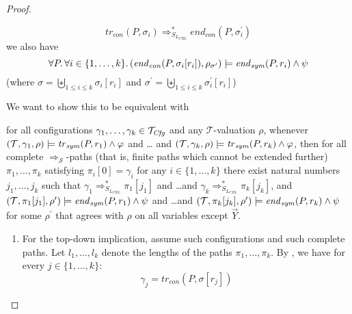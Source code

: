 \begin{proof}
\begin{proofenv}
\begin{equation*}
            \mathit{tr}_{\mathit{con}}(P, \sigma_i) \Rightarrow^*_{S_{L_{\mathit{CHL}}}} \mathit{end}_{\mathit{con}}(P, \sigma^\prime_i)
        \end{equation*}
        we also have
        \begin{equation*}
            \forall P.\, \forall i \in \{ 1, \ldots, k \} . \,
            (\mathit{end}_{\mathit{con}}(P, \sigma_i[r_i]), \rho_{\sigma^\prime})
            \models \mathit{end}_{\mathit{sym}}(P, r_i) \land \psi
        \end{equation*}
        (where $\sigma = \biguplus_{1 \leq i \leq k} \sigma_i[r_i]$
        and $\sigma^\prime = \biguplus_{1 \leq i \leq k} \sigma^\prime_i[r_i]$)
    \end{proofenv}

    We want to show this to be equivalent with
    \begin{proofenv}
        for all configurations $\gamma_1,\ldots,\gamma_k \in \mathcal{T}_{\mathit{Cfg}}$
        and any $\mathcal{T}$-valuation $\rho$,
        whenever $(\mathcal{T}, \gamma_1,\rho) \models \mathit{tr}_{\mathit{sym}}(P, r_1) \land \varphi$ and \ldots
        and $(\mathcal{T}, \gamma_k,\rho) \models \mathit{tr}_{\mathit{sym}}(P, r_k) \land \varphi$,
        then for all complete $\Rightarrow_{\mathcal{S}}$-paths (that is, finite paths which cannot be extended further)
        $\pi_1,\ldots,\pi_k$
        satisfying $\pi_i[0] = \gamma_i$ for any $i \in \{ 1, \ldots, k \}$
        there exist natural numbers $j_1, \ldots, j_k$
        such that $\gamma_1 \Rightarrow^{*}_{S_{L_{\mathit{CHL}}}} \pi_1[j_1]$
        and \ldots and $\gamma_k \Rightarrow^{*}_{S_{L_{\mathit{CHL}}}} \pi_k[j_k]$,
        and $(\mathcal{T}, \pi_1[j_1], \rho^\prime) \models \mathit{end}_{\mathit{sym}}(P, r_1) \land \psi$
        and \ldots and $(\mathcal{T}, \pi_k[j_k], \rho^\prime) \models \mathit{end}_{\mathit{sym}}(P, r_k) \land \psi$
        for some $\rho^\prime$ that agrees with $\rho$ on all variables except $\vec{Y}$.
    \end{proofenv}
    \begin{enumerate}
        \item For the top-down implication, assume such configurations and such complete paths.
            Let $l_1,\ldots,l_k$ denote the lengths of the paths $\pi_1,\ldots,\pi_k$.
            By ,
            we have for every $j \in \{ 1, \ldots, k \}$:
            \begin{equation*}
                \gamma_j = \mathit{tr}_{\mathit{con}}(P, \sigma[r_j])

\end{equation*}
\end{enumerate}
\end{proof}
